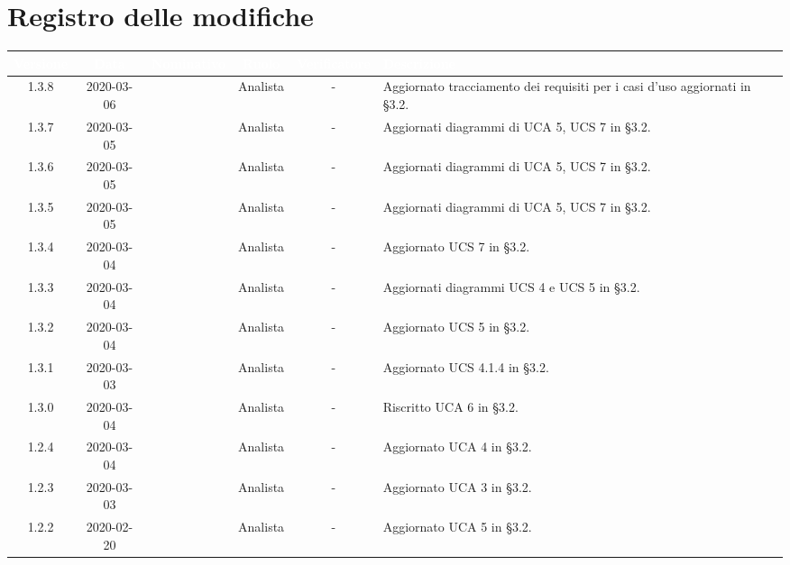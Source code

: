 \section*{Registro delle modifiche}
\setcounter{table}{-1}
{

\renewcommand{\arraystretch}{1.5}
\centering
\begin{longtable}{ c c  C{2.5cm} c c C{3.5cm}}
\textcolor{white}{\textbf{Versione}} &
\textcolor{white}{\textbf{Data}}&
\textcolor{white}{\textbf{Nominativo}}&
\textcolor{white}{\textbf{Ruolo}}&
\textcolor{white}{\textbf{Verificatore}}&
\textcolor{white}{\textbf{Descrizione}}\\
\endhead

1.3.8 & 2020-03-06 & \AT{} & Analista & - & Aggiornato tracciamento dei requisiti per i casi d'uso aggiornati in §3.2. \\

1.3.7 & 2020-03-05 & \AT{} & Analista & - & Aggiornati diagrammi di UCA 5, UCS 7 in §3.2. \\

1.3.6 & 2020-03-05 & \AT{} & Analista & - & Aggiornati diagrammi di UCA 5, UCS 7 in §3.2. \\

1.3.5 & 2020-03-05 & \AT{} & Analista & - & Aggiornati diagrammi di UCA 5, UCS 7 in §3.2. \\

1.3.4 & 2020-03-04 & \AT{} & Analista & - & Aggiornato UCS 7 in §3.2. \\

1.3.3 & 2020-03-04 & \SE{} & Analista & - & Aggiornati diagrammi UCS 4 e UCS 5 in §3.2. \\

1.3.2 & 2020-03-04 & \SE{} & Analista & - & Aggiornato UCS 5 in §3.2. \\

1.3.1 & 2020-03-03 & \SE{} & Analista & - & Aggiornato UCS 4.1.4 in §3.2. \\

1.3.0 & 2020-03-04 & \DF{} & Analista & - & Riscritto UCA 6 in §3.2. \\

1.2.4 & 2020-03-04 & \DF{} & Analista & - & Aggiornato UCA 4 in §3.2. \\

1.2.3 & 2020-03-03 & \DF{} & Analista & - & Aggiornato UCA 3 in §3.2. \\

1.2.2 & 2020-02-20 & \AT{} & Analista & - & Aggiornato UCA 5 in §3.2. \\


\end{longtable}}
